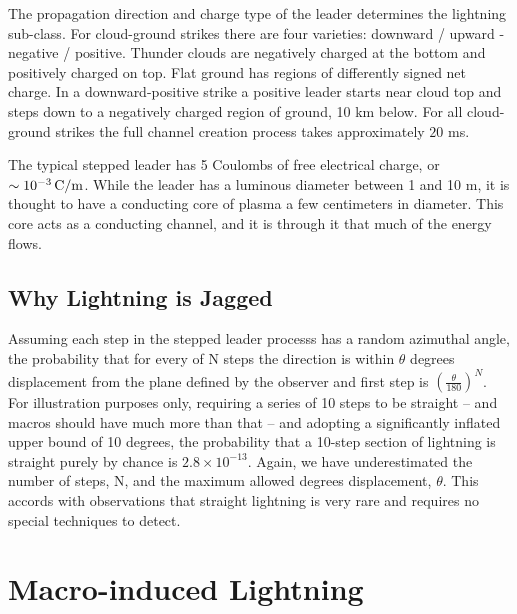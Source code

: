 \documentclass[%
 reprint,
 amsmath,amssymb,
 aps,
]{revtex4-2}
\begin{document}
    The propagation direction and charge type of the leader determines the lightning sub-class. For cloud-ground strikes there are four varieties: downward / upward - negative / positive. Thunder clouds are negatively charged at the bottom and positively charged on top. Flat ground has regions of differently signed net charge. In a downward-positive strike a positive leader starts near cloud top and steps down to a negatively charged region of ground, 10 km below. For all cloud-ground strikes the full channel creation process takes approximately $20$ ms.

    The typical stepped leader has 5 Coulombs of free electrical charge, or $\sim10^{-3} \, \rm{C/m}$. While the leader has a luminous diameter between 1 and 10 m, it is thought to have a conducting core of plasma a few centimeters in diameter. This core acts as a conducting channel, and it is through it that much of the energy flows.
    
    
    \subsection{Why Lightning is Jagged} %
    \label{sub:why_lightning_is_jagged}

        Assuming each step in the stepped leader processs has a random azimuthal angle, the probability that for every of N steps the direction is within $\theta$ degrees displacement from the plane defined by the observer and first step is $\left(\frac{\theta}{180}\right)^{N}$. For illustration purposes only, requiring a series of 10 steps to be straight -- and macros should have much more than that -- and adopting a significantly inflated upper bound of 10 degrees, the probability that a 10-step section of lightning is straight purely by chance is $2.8 \times 10^{-13}$. Again, we have underestimated the number of steps, N, and the maximum allowed degrees displacement, $\theta$. This accords with observations that straight lightning is very rare and requires no special techniques to detect.
        



\section{Macro-induced \textbf{}Lightning} %
\label{sec:macro_induced_lightning}
\end{document}
